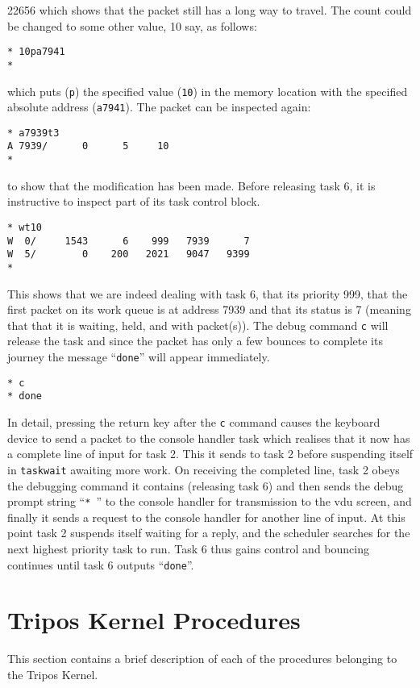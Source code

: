 22656 which shows that the packet still has a long way to travel.  The
count could be changed to some other value, 10 say, as follows:
\begin{verbatim}
* 10pa7941
*
\end{verbatim}
\noindent
which puts (\verb|p|) the specified value (\verb|10|) in the memory
location with the specified absolute address (\verb|a7941|).  The
packet can be inspected again:
\begin{verbatim}
* a7939t3
A 7939/      0      5     10
*
\end{verbatim}
\noindent
to show that the modification has been made.  Before releasing task 6, it is 
instructive to inspect part of its task control block.
\begin{verbatim}
* wt10
W  0/     1543      6    999   7939      7
W  5/        0    200   2021   9047   9399
*
\end{verbatim}
This shows that we are indeed dealing with task 6, that its priority
999, that the first packet on its work queue is at address 7939 and
that its status is 7 (meaning that that it is waiting, held, and with
packet(s)).  The debug command \verb|c| will release the task and since the
packet has only a few bounces to complete its journey the message
``\verb|done|'' will appear immediately.
\begin{verbatim}
* c
* done
\end{verbatim}
In detail, pressing the return key after the \verb|c| command causes
the keyboard device to send a packet to the console handler task which
realises that it now has a complete line of input for task 2.  This it
sends to task 2 before suspending itself in \verb|taskwait| awaiting
more work.  On receiving the completed line, task 2 obeys the
debugging command it contains (releasing task 6) and then sends the
debug prompt string ``\verb|*|~'' to the console handler for
transmission to the vdu screen, and finally it sends a request to the
console handler for another line of input.  At this point task 2
suspends itself waiting for a reply, and the scheduler searches for
the next highest priority task to run.  Task 6 thus gains control and
bouncing continues until task 6 outputs ``\verb|done|''.


\section{Tripos Kernel Procedures}

This section contains a brief description of each of the procedures
belonging to the Tripos Kernel.

